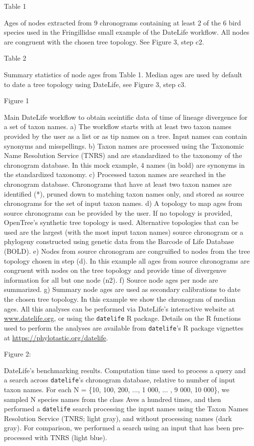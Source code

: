 Table 1

Ages of nodes extracted from 9 chronograms containing at least 2 of the 6 bird species used in the Fringillidae small example of the DateLife workflow. All nodes are congruent with the chosen tree topology. See Figure 3, step c2.

Table 2

Summary statistics of node ages from Table 1. Median ages are used by default to date a tree topology using DateLife, see Figure 3, step c3.

Figure 1

Main DateLife workflow to obtain sceintific data of time of lineage divergence for a set of taxon names. a) The workflow starts with at least two taxon names provided by the user as a list or as tip names on a tree. Input names can contain synonyms and misspellings.
b) Taxon names are processed using the Taxonomic Name Resolution Service (TNRS) and are standardized to the taxonomy of the chronogram database. In this mock example, 4 names (in bold) are synonyms in the standardized taxonomy.
c) Processed taxon names are searched in the chronogram database. Chronograms that have at least two taxon names are identified (*), pruned down to matching taxon names only, and stored as source chronograms for the set of input taxon names.
d) A topology to map ages from source chronograms can be provided by the user. If no topology is provided, OpenTree's synthetic tree topology is used. Alternative topologies that can be used are the largest (with the most input taxon names) source chronogram or a phylogeny constructed using genetic data from the Barcode of Life Database (BOLD).
e) Nodes from source chronogram are congruified to nodes from the tree topology chosen in step (d). In this example all ages from source chronograms are congruent with nodes on the tree topology and provide time of divergenve information for all but one node (n2).
f) Source node ages per node are summarized.
g) Summary node ages are used as secondary calibrations to date the chosen tree topology. In this example we show the chronogram of median ages.
All this analyses can be performed via DateLife's interactive website at \url{www.datelife.org}, or using the \texttt{datelife} R package. Details on the R functions used to perform the analyses are available from \texttt{datelife}'s R package vignettes at \url{https://phylotastic.org/datelife}.

Figure 2:

DateLife's benchmarking results. Computation time used to process a query and a search across \texttt{datelife}'s chronogram database, relative to number of input taxon names. For each N = \{10, 100, 200, ..., 1 000, ... , 9 000, 10 000\}, we sampled N species names from the class Aves a hundred times, and then performed a \texttt{datelife} search processing the input names using the Taxon Names Resolution Service (TNRS; light gray), and without processing names (dark gray). For comparison, we performed a search using an input that has been pre-processed with TNRS (light blue).

